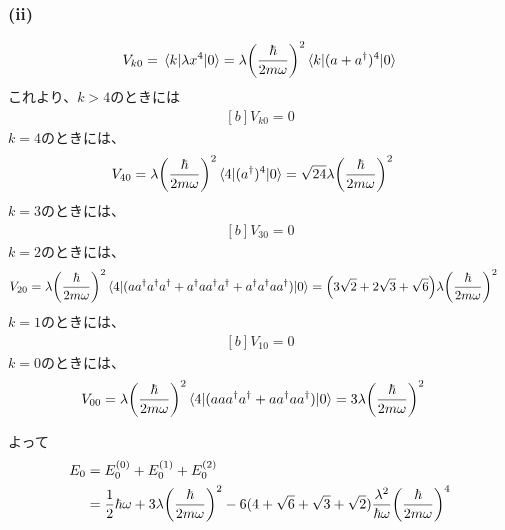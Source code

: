 \documentclass[../../sp_2018.tex]{subfiles}
\begin{document}
\subsubsection*{(ii)}
\begin{equation}\begin{aligned}[b]
    V_{k0}=\mel{k}{\lambda x^4}{0} = \lambda\qty(\frac{\hbar}{2m\omega})^2\mel{k}{(a+a^\dagger)^4}{0}
\end{aligned}\end{equation}
これより、\(k>4\)のときには
\begin{equation}\begin{aligned}[b]
    V_{k0} = 0
\end{aligned}\end{equation}
\(k=4\)のときには、
\begin{equation}\begin{aligned}[b]
    V_{40}&=\lambda\qty(\frac{\hbar}{2m\omega})^2\mel{4}{(a^\dagger)^4}{0}=\sqrt{24}\lambda\qty(\frac{\hbar}{2m\omega})^2
\end{aligned}\end{equation}
\(k=3\)のときには、
\begin{equation}\begin{aligned}[b]
    V_{30}=0
\end{aligned}\end{equation}
\(k=2\)のときには、
\begin{equation}\begin{aligned}[b]
    V_{20}
    &=\lambda\qty(\frac{\hbar}{2m\omega})^2\mel{4}{(aa^\dagger a^\dagger a^\dagger+a^\dagger a a^\dagger a^\dagger+ a^\dagger a^\dagger a a^\dagger)}{0}
    =\qty(3\sqrt{2}+2\sqrt{3}+\sqrt{6})\lambda\qty(\frac{\hbar}{2m\omega})^2
\end{aligned}\end{equation}
\(k=1\)のときには、
\begin{equation}\begin{aligned}[b]
    V_{10}=0
\end{aligned}\end{equation}
\(k=0\)のときには、
\begin{equation}\begin{aligned}[b]
    V_{00}
    &=\lambda\qty(\frac{\hbar}{2m\omega})^2\mel{4}{(aaa^\dagger a^\dagger+aa^\dagger aa^\dagger)}{0}
    =3\lambda\qty(\frac{\hbar}{2m\omega})^2
\end{aligned}\end{equation}

よって
\begin{equation}\begin{aligned}[b]
    E_0 &= E_0^{(0)}+E_0^{(1)}+E_0^{(2)}\\
    &= \frac{1}{2}\hbar\omega + 3\lambda\qty(\frac{\hbar}{2m\omega})^2
        -6(4+\sqrt{6}+\sqrt{3}+\sqrt{2})\frac{\lambda^2}{\hbar\omega}\qty(\frac{\hbar}{2m\omega})^4
\end{aligned}\end{equation}
\end{document}

